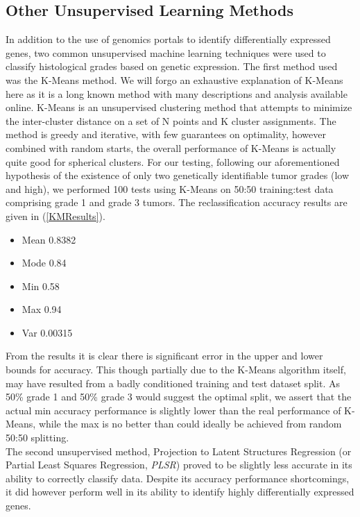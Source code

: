 \documentclass[a4paper,10pt]{article}
\begin{document}
\subsection{Other Unsupervised Learning Methods}
In addition to the use of genomics portals to identify differentially expressed genes, two common unsupervised machine learning techniques were
used to classify histological grades based on genetic expression. The first method used was the K-Means method. We will forgo an exhaustive explanation
of K-Means here as it is a long known method with many descriptions and analysis available online. K-Means is an unsupervised clustering method
that attempts to minimize the inter-cluster distance on a set of N points and K cluster assignments. The method is greedy and iterative, with few guarantees
on optimality, however combined with random starts, the overall performance of K-Means is actually quite good for spherical clusters\cite{kmeans}. 
For our testing, following our aforementioned hypothesis of the existence of only two genetically identifiable tumor grades (low and high), we performed
100 tests using K-Means on 50:50 training:test data comprising grade 1 and grade 3 tumors. The reclassification accuracy results are given in (\ref{KMResults}).
\begin{itemize}\label{KMResults}
\item Mean 0.8382
\item Mode 0.84
\item Min 0.58
\item Max 0.94
\item Var 0.00315
\end{itemize}
From the results it is clear there is significant error in the upper and lower bounds for accuracy. This though partially due to the K-Means algorithm
itself, may have resulted from a badly conditioned training and test dataset split. As 50\% grade 1 and 50\% grade 3 would suggest the optimal split,
we assert that the actual min accuracy performance is slightly lower than the real performance of K-Means, while the max is no better than could
ideally be achieved from random 50:50 splitting.\\
The second unsupervised method, Projection to Latent Structures Regression (or Partial Least Squares Regression, \emph{PLSR})\cite{Wold1} proved to 
be slightly less accurate in its ability to correctly classify data. Despite its accuracy performance shortcomings, it did however
perform well in its ability to identify highly differentially expressed genes.
\end{document}
